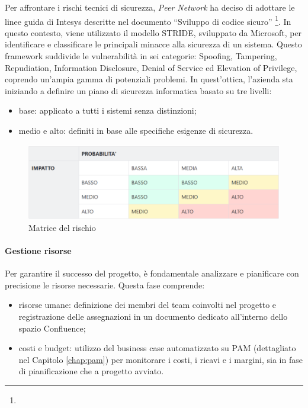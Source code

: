             Per affrontare i rischi tecnici di sicurezza, \textit{Peer Network} ha deciso di adottare le linee guida di Intesys
            descritte nel documento “Sviluppo di codice sicuro” \footnote{}.
            In questo contesto, viene utilizzato il modello STRIDE,
            sviluppato da Microsoft, per identificare e classificare le principali minacce alla sicurezza di un sistema.
            Questo framework suddivide le vulnerabilità in sei categorie: Spoofing, Tampering, Repudiation, Information
            Disclosure, Denial of Service ed Elevation of Privilege, coprendo un’ampia gamma di potenziali problemi.
            In quest’ottica, l’azienda sta iniziando a definire un piano di sicurezza informatica basato su tre livelli:
            \begin{itemize}
                \item base: applicato a tutti i sistemi senza distinzioni;
                \item medio e alto: definiti in base alle specifiche esigenze di sicurezza.
            \end{itemize}

            \begin{figure}
                \centering
                \includegraphics[scale=0.5]{figures/riskMatrix.png}
                \caption{Matrice del rischio}
                \label{fig:risk-matrix}
            \end{figure}

            \paragraph{Gestione risorse}
            Per garantire il successo del progetto, è fondamentale analizzare e pianificare con precisione le risorse necessarie. Questa fase comprende:
            \begin{itemize}
                \item risorse umane: definizione dei membri del team coinvolti nel progetto e registrazione delle assegnazioni in un documento dedicato all'interno dello spazio Confluence;
                \item costi e budget: utilizzo del business case automatizzato su \ac{PAM} (dettagliato nel Capitolo \ref{chap:pam}) per monitorare i costi,
                i ricavi e i margini, sia in fase di pianificazione che a progetto avviato.
            \end{itemize}

